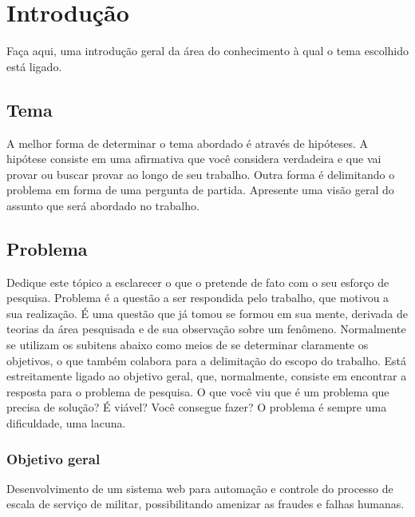 \chapter{Introdução}
\label{chp:introduction}
Faça aqui, uma introdução geral da área do conhecimento à qual o tema escolhido
está ligado. 

\section{Tema}
A melhor forma de determinar o tema abordado é através de hipóteses. A hipótese
consiste em uma afirmativa que você considera verdadeira e que vai provar ou
buscar provar ao longo de seu trabalho. Outra forma é delimitando o problema em
forma de uma pergunta de partida. Apresente uma visão geral do assunto que será
abordado no trabalho.

\section{Problema}
Dedique este tópico a esclarecer o que o pretende de fato com o seu esforço de
pesquisa. Problema é a questão a ser respondida pelo trabalho, que motivou a sua
realização. É uma questão que já tomou se formou em sua mente, derivada de
teorias da área pesquisada e de sua observação sobre um fenômeno.  Normalmente
se utilizam os subitens abaixo como meios de se determinar claramente os
objetivos, o que também colabora para a delimitação do escopo do trabalho. Está
estreitamente ligado ao objetivo geral, que, normalmente, consiste em encontrar
a resposta para o problema de pesquisa.  O que você viu que é um problema que
precisa de solução? É viável? Você consegue fazer? O problema é sempre uma
dificuldade, uma lacuna.\citep{risg}

\subsection{Objetivo geral}
Desenvolvimento de um sistema web para automação e controle do processo de escala de serviço de militar, possibilitando amenizar as fraudes e falhas humanas.

